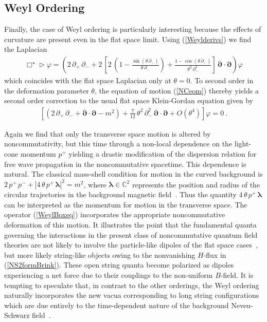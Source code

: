 \documentclass[11pt,a4paper]{article}
\newcommand{\1}{\mathbb{1}}
\newcommand{\mbf}[1]{{\boldsymbol {#1} }}
\def\mdell{{\mbf\partial}}
\newcommand{\complex}{{\mathbb C}} %
\newcommand{\beq}{\begin{eqnarray}}
\newcommand{\eeq}{\end{eqnarray}}
\begin{document}
\subsection{Weyl Ordering\label{ScalarWeyl}}

Finally, the case of Weyl ordering is particularly interesting because
the effects of curvature are present even in the flat space
limit. Using (\ref{Weylderivs}) we find the Laplacian
\beq
\Box^\star\triangleright\varphi=\left(2\,\partial_+\,\partial_-
+2\,\left[2\,\left(1-\frac{\sin(\theta\,\partial_-)}
{\theta\,\partial_-}\right)+\frac{1-\cos(\theta\,\partial_-)}
{\theta^2\,\partial_-^2}\right]\,\overline{\mdell}\cdot\mdell
\right)\varphi
\label{WeylBoxeq}\eeq
which coincides with the flat space Laplacian only at $\theta=0$. To
second order in the deformation parameter $\theta$, the equation of
motion (\ref{NCeom}) thereby yields a second order correction to the
usual flat space Klein-Gordan equation given by
\beq
\left[\left(2\,\partial_+\,\partial_-+\overline{\mdell}\cdot\mdell-m^2
\right)+\mbox{$\frac7{12}$}\,\theta^2\,\partial_-^2\,\overline{\mdell}\cdot
\mdell+O\left(\theta^4\right)\right]\varphi=0 \ .
\label{KGeqcorr}\eeq

Again we find that only the transverse space motion is
altered by noncommutativity, but this time through a non-local
dependence on the light-cone momentum $p^+$ yielding a drastic
modification of the dispersion relation for free wave propagation in
the noncommutative spacetime. This dependence is
natural. The classical mass-shell condition for motion in the curved
background is $2\,p^+\,p^-+|4\,\theta\,p^+\,\mbf\lambda|^2=m^2$, where
$\mbf\lambda\in\complex^2$ represents the position and radius of the
circular trajectories in the background magnetic
field~\cite{CFS1}. Thus the quantity $4\,\theta\,p^+\,\mbf\lambda$ can be
interpreted as the momentum for motion in the transverse space. The
operator (\ref{WeylBoxeq}) incorporates the appropriate noncommutative
deformation of this motion. It illustrates the point that the
fundamental quanta governing the interactions in the present class of
noncommutative quantum field theories are not likely to involve the
particle-like dipoles of the flat space cases~\cite{Sheikh1,BigSuss1},
but more likely string-like objects owing to the nonvanishing $H$-flux in
(\ref{NS2formBrink}). These open string quanta become polarized as
dipoles experiencing a net force due to their couplings to the
non-uniform $B$-field. It is tempting to speculate that, in contrast
to the other orderings, the Weyl ordering naturally incorporates the
new vacua corresponding to long string configurations which are due
entirely to the time-dependent nature of the background Neveu-Schwarz
field~\cite{BDAKZ1}.
\end{document}
